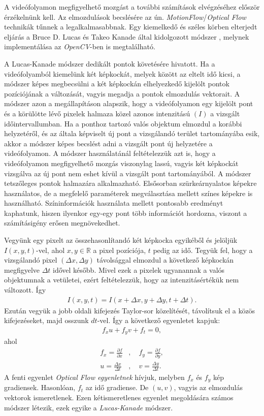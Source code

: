 A videófolyamon megfigyelhető mozgást a további számítások elvégzéséhez először érzékelnünk kell. Az elmozdulások becslésére az ún. \textit{MotionFlow}/\textit{Optical Flow} technikák tűnnek a legalkalmasabbnak. Egy kiemelkedő és széles körben elterjedt eljárás a Bruce D. Lucas és Takeo Kanade által kidolgozott módszer \cite{lucas1981iterative}, melynek implementálása az \textit{OpenCV}-ben is megtalálható.

A Lucas-Kanade módszer dedikált pontok követésére hivatott. Ha a videófolyamból kiemelünk két képkockát, melyek között az eltelt idő kicsi, a módszer képes megbecsülni a két képkockán elhelyezkedő kijelölt pontok pozíciójának a változását, vagyis megadja a pontok elmozdulás vektorait. A módszer azon a megállapításon alapszik, hogy a videófolyamon egy kijelölt pont és a körülötte lévő pixelek halmaza közel azonos intenzitású $(I)$ a vizsgált időintervallumban. Ha a ponthoz tartozó valós objektum elmozdul a korábbi helyzetéről, és az általa képviselt új pont a vizsgálandó terület tartományába esik, akkor a módszer képes becslést adni a vizsgált pont új helyzetére a videófolyamon. A módszer használatánál feltételezzük azt is, hogy a videófolyamon megfigyelhető mozgás viszonylag lassú, vagyis két képkockát vizsgálva az új pont nem eshet kívül a vizsgált pont tartományából. A módszer tetszőleges pontok halmazára alkalmazható. Elsősorban szürkeárnyalatos képekre használatos, de a megfelelő paraméterek megválasztása mellett színes képekre is használható. Színinformációk használata mellett pontosabb eredményt kaphatunk, hiszen ilyenkor egy-egy pont több információt hordozna, viszont a számításigény erősen megnövekedhet. 

Vegyünk egy pixelt az összehasonlítandó két képkocka egyikéből és jelöljük $I(x,y,t)$-vel, ahol $x,y \in \mathbb{R}$ a pixel pozíciója, $t$ pedig az idő. Tegyük fel, hogy a vizsgálandó pixel $(\Delta x, \Delta y)$ távolsággal elmozdul a következő képkockán megfigyelve $\Delta t$ idővel később. Mivel ezek a pixelek ugyanannak a valós objektumnak a vetületei, ezért feltételezzük, hogy az intenzitásértékük nem változott. Így
\begin{align*}
I(x,y,t) = I(x+\Delta x,y+\Delta y,t+\Delta t).
\end{align*}
Ezután vegyük a jobb oldali kifejezés Taylor-sor közelítését, távolítsuk el a közös kifejezéseket, majd osszunk $dt$-vel. Így a következő egyenletet kapjuk:
\begin{align*}
f_xu+f_yv+f_t=0,
\end{align*}
ahol
\begin{align*}
f_x = \frac{\partial f}{\partial x} &, \quad f_y = \frac{\partial f}{\partial y}, \\
u = \frac{\Delta x}{\Delta t} &, \quad v = \frac{\Delta y}{\Delta t}.
\end{align*}
A fenti egyenlet \textit{Optical Flow egyenletnek} hívjuk, melyben $f_x$ és $f_y$ kép gradiensek. Hasonlóan, $f_t$ az idő gradiense. De $(u,v)$, vagyis az elmozdulás vektorok ismeretlenek. Ezen kétismeretlenes egyenlet megoldására számos módszer létezik, ezek egyike a \textit{Lucas-Kanade} módszer.

